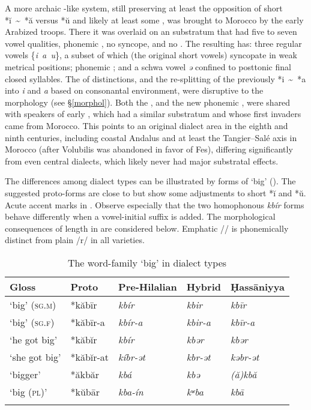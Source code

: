 \documentclass[output=paper]{langsci/langscibook}
\begin{document}
A more archaic -like system, still preserving at least the opposition of short *ĭ~{\textasciitilde}~*ă versus *ŭ and likely at least some , was brought to Morocco by the early Arabized  troops. There it was overlaid on an  substratum that had five to seven vowel qualities, phonemic , no syncope, and no . The resulting   has: three regular vowels \{\textit{i~a~u}\}, a subset of which (the original short vowels) syncopate in weak metrical positions; phonemic ; and a schwa vowel \textit{ə} confined to posttonic final closed syllables. The  of  distinctions, and the re-splitting of the previously  *i~{\textasciitilde}~*a into \textit{i} and \textit{a} based on consonantal environment, were disruptive to the morphology (see §\ref{morphol}). Both the , and the new phonemic , were shared with speakers of early  , which had a similar  substratum and whose first invaders came from Morocco. This points to an original dialect area in the eighth and ninth centuries, including coastal Andalus and at least the Tangier–Salé axis in Morocco (after Volubilis was abandoned in favor of Fes), differing significantly from even  central  dialects, which likely never had major  substratal effects. 

The differences among  dialect types can be illustrated by forms of ‘big’ (). The suggested proto-forms are close to  but show some adjustments to short *ĭ and *ŭ. Acute accent marks  in . Observe especially that the two homophonous  \textit{kbír} forms behave differently when a vowel-initial suffix is added. The morphological consequences of length  in  are considered below. Emphatic /{\R}/ is phonemically distinct from plain /r/ in all varieties. 

\begin{table}
\caption{\label{tab:heath:1}\label{bkm:Ref13483830}The word-family `big' in  dialect types}
\begin{tabular}{*{5}{l}}
\lsptoprule
{Gloss} & {\normalfont Proto} & {\normalfont Pre-Hilalian} & {\normalfont Hybrid} & {\normalfont Ḥassāniyya}\\\midrule
‘big’ (\textsc{sg.m}) & *kăbīr & \textit{kbír} & \textit{kbir} & \textit{kbīr}\\
‘big’ (\textsc{sg.f}) & *kăbīr-a & \textit{kbír-a} & \textit{kbir-a} & \textit{kbīr-a}\\
‘he got big’ & *kăbĭr & \textit{kbír} & \textit{kbər} & \textit{kbər}\\
‘she got big’ & *kăbĭr-at & \textit{kíbr-ət} & \textit{kbr-ət} & \textit{kəbr-ət}\\
‘bigger’ & *ăkbăr & \textit{kbá{\R}} & \textit{kbə{\R}} & \textit{(ă)kbă{\R}}\\
‘big (\textsc{pl})’ & *kŭbār & \textit{kba{\R}-ín} & \textit{kʷba{\R}} & \textit{kbā{\R}}\\
\lspbottomrule
\end{tabular}
\end{table}
\end{document}

